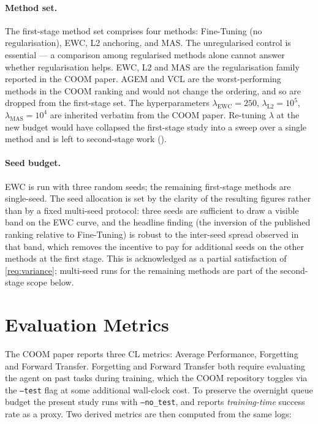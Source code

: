 \paragraph{Method set.}
The first-stage method set comprises four methods: Fine-Tuning
(no regularisation), EWC, L2 anchoring, and MAS. The
unregularised control is essential --- a comparison among
regularised methods alone cannot answer whether regularisation
helps. EWC, L2 and MAS are the regularisation family reported
in the COOM paper. AGEM and VCL are the worst-performing
methods in the COOM ranking and would not change the ordering,
and so are dropped from the first-stage set. The hyperparameters
$\lambda_{\text{EWC}}=250$, $\lambda_{\text{L2}}=10^{5}$,
$\lambda_{\text{MAS}}=10^{4}$ are inherited verbatim from the
COOM paper. Re-tuning $\lambda$ at the new budget would have
collapsed the first-stage study into a sweep over a single
method and is left to second-stage work
().

\paragraph{Seed budget.}
EWC is run with three random seeds; the remaining first-stage
methods are single-seed. The seed allocation is set by the
clarity of the resulting figures rather than by a fixed
multi-seed protocol: three seeds are sufficient to draw a
visible band on the EWC curve, and the headline finding (the
inversion of the published ranking relative to Fine-Tuning) is
robust to the inter-seed spread observed in that band, which
removes the incentive to pay for additional seeds on the other
methods at the first stage. This is acknowledged as a partial
satisfaction of \ref{req:variance}; multi-seed runs for the
remaining methods are part of the second-stage scope below.

\section{Evaluation Metrics}
\label{sec:metrics}

The COOM paper reports three CL metrics: Average Performance,
Forgetting and Forward Transfer. Forgetting and Forward Transfer
both require evaluating the agent on past tasks during training,
which the COOM repository toggles via the \texttt{--test} flag at
some additional wall-clock cost. To preserve the overnight queue
budget the present study runs with \texttt{--no\_test}, and reports
\emph{training-time} success rate as a proxy. Two derived metrics
are then computed from the same logs:

